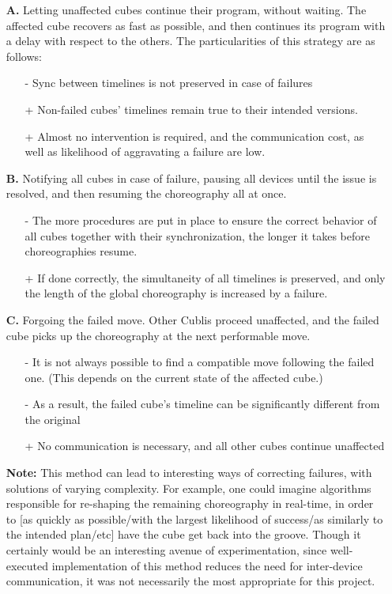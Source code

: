 \begin{itemize}
\item[\textbf{A.}] Letting unaffected cubes continue their program, without waiting. The affected cube recovers as fast as possible, and then continues its program with a delay with respect to the others.
The particularities of this strategy are as follows:

\begin{itemize}
\item[-] Sync between timelines is not preserved in case of failures
\item[+] Non-failed cubes' timelines remain true to their intended versions.
\item[+] Almost no intervention is required, and the communication cost, as well as likelihood of aggravating a failure are low.
\end{itemize}

\item[\textbf{B.}] Notifying all cubes in case of failure, pausing all devices until the issue is resolved, and then resuming the choreography all at once.

\begin{itemize}
\item[-] The more procedures are put in place to ensure the correct behavior of all cubes together with their synchronization, the longer it takes before choreographies resume. 
\item[+] If done correctly, the simultaneity of all timelines is preserved, and only the length of the global choreography is increased by a failure.
\end{itemize}

\item[\textbf{C.}] Forgoing the failed move. Other Cublis proceed unaffected, and the failed cube picks up the choreography at the next performable move.

\begin{itemize}
\item[-] It is not always possible to find a compatible move following the failed one. (This depends on the current state of the affected cube.)
\item[-] As a result, the failed cube's timeline can be significantly different from the original
\item[+] No communication is necessary, and all other cubes continue unaffected
\end{itemize}

\textbf{Note:} This method can lead to interesting ways of correcting failures, with solutions of varying complexity. For example, one could imagine algorithms responsible for re-shaping the remaining choreography in real-time, in order to [as quickly as possible/with the largest likelihood of success/as similarly to the intended plan/etc] have the cube get back into the groove.
Though it certainly would be an interesting avenue of experimentation, since well-executed implementation of this method reduces the need for inter-device communication, it was not necessarily the most appropriate for this project.


\end{itemize}
